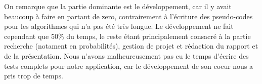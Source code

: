 On remarque que la partie dominante est le développement, car il y avait beaucoup à faire en partant de zero, contrairement à l'écriture des pseudo-codes pour les algorithmes qui n'a pas été très longue. Le développement ne fait cependant que 50\% du temps, le reste étant principalement consacré à la partie recherche (notament en probabilités), gestion de projet et rédaction du rapport et de la présentation.
Nous n'avons malheureusement pas eu le temps d'écrire des tests complets pour notre application, car le développement de son coeur nous a pris trop de temps.


